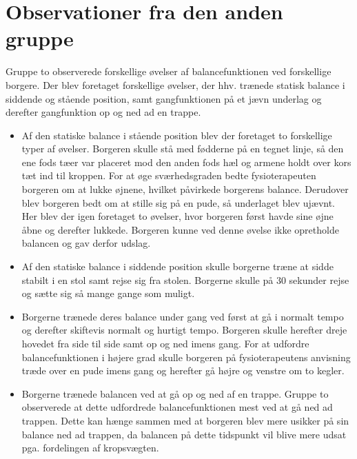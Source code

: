 \section{Observationer fra  den anden gruppe}
Gruppe to observerede forskellige øvelser af balancefunktionen ved forskellige borgere. Der blev foretaget forskellige øvelser, der hhv. trænede statisk balance i siddende og stående position, samt gangfunktionen på et jævn underlag og derefter gangfunktion op og ned ad en trappe. 
\begin{itemize}
\item Af den statiske balance i stående position blev der foretaget to forskellige typer af øvelser. Borgeren skulle stå med fødderne på en tegnet linje, så den ene fods tæer var placeret mod den anden fods hæl og armene holdt over kors tæt ind til kroppen. For at øge sværhedsgraden bedte fysioterapeuten borgeren om at lukke øjnene, hvilket påvirkede borgerens balance. Derudover blev borgeren bedt om at stille sig på en pude, så underlaget blev ujævnt. Her blev der igen foretaget to øvelser, hvor borgeren først havde sine øjne åbne og derefter lukkede. Borgeren kunne ved denne øvelse ikke opretholde balancen og gav derfor udslag. 
\item Af den statiske balance i siddende position skulle borgerne træne at sidde stabilt i en stol samt rejse sig fra stolen. Borgerne skulle på $30$ sekunder rejse og sætte sig så mange gange som muligt. 
\item Borgerne trænede deres balance under gang ved først at gå i normalt tempo og derefter skiftevis normalt og hurtigt tempo. Borgeren skulle herefter dreje hovedet fra side til side samt op og ned imens gang. For at udfordre balancefunktionen i højere grad skulle borgeren på fysioterapeutens anvisning træde over en pude imens gang og herefter gå højre og venstre om to kegler.
\item Borgerne trænede balancen ved at gå op og ned af en trappe. Gruppe to observerede at dette udfordrede balancefunktionen mest ved at gå ned ad trappen. Dette kan hænge sammen med at borgeren blev mere usikker på sin balance ned ad trappen, da balancen på dette tidspunkt vil blive mere udsat pga. fordelingen af kropsvægten. 
\end{itemize} 